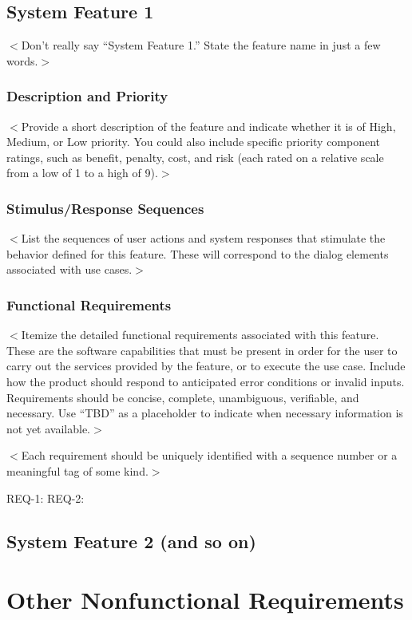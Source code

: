 \documentclass{scrreprt}
\begin{document}
\section{System Feature 1}
$<$Don’t really say “System Feature 1.” State the feature name in just a few 
words.$>$

\subsection{Description and Priority}
$<$Provide a short description of the feature and indicate whether it is of 
High, Medium, or Low priority. You could also include specific priority 
component ratings, such as benefit, penalty, cost, and risk (each rated on a 
relative scale from a low of 1 to a high of 9).$>$

\subsection{Stimulus/Response Sequences}
$<$List the sequences of user actions and system responses that stimulate the 
behavior defined for this feature. These will correspond to the dialog elements 
associated with use cases.$>$

\subsection{Functional Requirements}
$<$Itemize the detailed functional requirements associated with this feature.  
These are the software capabilities that must be present in order for the user 
to carry out the services provided by the feature, or to execute the use case.  
Include how the product should respond to anticipated error conditions or 
invalid inputs. Requirements should be concise, complete, unambiguous, 
verifiable, and necessary. Use “TBD” as a placeholder to indicate when necessary 
information is not yet available.$>$

$<$Each requirement should be uniquely identified with a sequence number or a 
meaningful tag of some kind.$>$

REQ-1:	REQ-2:

\section{System Feature 2 (and so on)}


\chapter{Other Nonfunctional Requirements}
\end{document}
